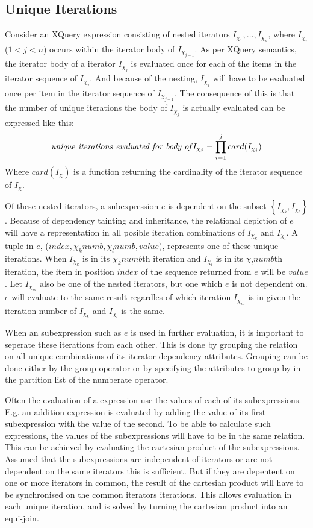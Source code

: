 \subsection{Unique Iterations}
\label{sect:trans:TD:implic}
Consider an XQuery expression consisting of nested iterators $I_{\chi_1},\ldots,I_{\chi_n}$, where $I_{\chi_j}$
($1<j<n$) occurs within the iterator body of $I_{\chi_{j-1}}$. As per XQuery semantics, the iterator body of a
iterator $I_{\chi_j}$ is evaluated once for each of the items in the iterator sequence of $I_{\chi_j}$. And because
of the nesting, $I_{\chi_j}$ will have to be evaluated once per item in the iterator sequence of $I_{\chi_{j-1}}$.
The consequence of this is that the number of unique iterations the body of $I_{\chi_j}$ is actually evaluated can
be expressed like this: 
\begin{equation*}
\mbox{\textit{unique iterations evaluated for body of}}I_{\chi_j}=\displaystyle \prod_{i=1}^{j}card(I_{\chi_i})
\end{equation*}  
Where $card(I_{\chi})$ is a function returning the cardinality of the iterator sequence of $I_{\chi}$.

Of these nested iterators, a subexpression $e$ is dependent on the subset
$\left\{I_{\chi_k},I_{\chi_l}\right\}$. Because of dependency tainting and inheritance, the relational
depiction of $e$ will have a representation in all posible iteration combinations of $I_{\chi_k}$ and
$I_{\chi_l}$. A tuple in $e$, ($index, \chi_k{numb},\chi_l{numb}, value$), represents one of these unique
iterations. When $I_{\chi_k}$ is in its $\chi_k{numb}$th iteration and $I_{\chi_l}$ is in its $\chi_l{numb}$th
iteration, the item in position $index$ of the sequence returned from $e$ will be $value$. Let $I_{\chi_m}$ also
be one of the nested iterators, but one which $e$ is not dependent on. $e$ will evaluate to the same result
regardles of which iteration $I_{\chi_m}$ is in given the iteration number of $I_{\chi_k}$ and $I_{\chi_l}$ is the
same.

When an subexpression such as $e$ is used in further evaluation, it is important to seperate these iterations from
each other. This is done by grouping the relation on all unique combinations of its iterator dependency attributes.
Grouping can be done either by the \textsf{group} operator or by specifying the attributes to group by in the
partition list of the \textsf{numberate} operator.

Often the evaluation of a expression use the values of each of its subexpressions. E.g. an addition expression is
evaluated by adding the value of its first subexpression with the value of the second. To be able to calculate
such expressions, the values of the subexpressions will have to be in the same relation. This can be achieved by
evaluating the cartesian product of the subexpressions. Assumed that the subexpressions are independent of
iterators or are not dependent on the same iterators this is sufficient. But if they are depentent on one or more
iterators in common, the result of the cartesian product will have to be synchronised on the common iterators
iterations. This allows evaluation in each unique iteration, and is solved by turning the cartesian product into
an equi-join.

